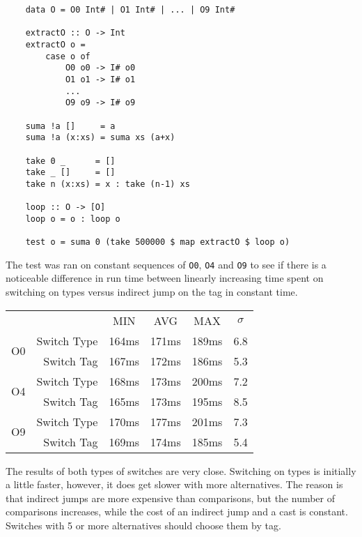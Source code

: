 \documentclass[en]{pracamgr}
\begin{document}
\begin{verbatim}
    data O = O0 Int# | O1 Int# | ... | O9 Int#
    
    extractO :: O -> Int
    extractO o =
        case o of
            O0 o0 -> I# o0
            O1 o1 -> I# o1
            ...
            O9 o9 -> I# o9

    suma !a []     = a
    suma !a (x:xs) = suma xs (a+x)

    take 0 _      = []
    take _ []     = []
    take n (x:xs) = x : take (n-1) xs

    loop :: O -> [O]
    loop o = o : loop o

    test o = suma 0 (take 500000 $ map extractO $ loop o)
\end{verbatim}


The test was ran on constant sequences of
\texttt{O0}, \texttt{O4} and \texttt{O9} to see
if there is a noticeable difference in run time
between linearly increasing time spent on switching on types
versus indirect jump on the tag in constant time.

\begin{center}
\begin{tabular}{c r c c c c}
    & & MIN & AVG & MAX & $\sigma$ \\
    \cline{3-6}
        
    \multirow{2}{*}{O0} & Switch Type & 164ms & 171ms & 189ms & 6.8 \\
    & Switch Tag & 167ms & 172ms & 186ms & 5.3 \\
    \cline{2-6}

    \multirow{2}{*}{O4} & Switch Type & 168ms & 173ms & 200ms & 7.2 \\
    & Switch Tag & 165ms & 173ms & 195ms & 8.5 \\
    \cline{2-6}

    \multirow{2}{*}{O9} & Switch Type & 170ms & 177ms & 201ms & 7.3 \\
    & Switch Tag & 169ms & 174ms & 185ms & 5.4 \\
\end{tabular}
\end{center}

The results of both types of switches are very close.
Switching on types is initially a little faster, however,
it does get slower with more alternatives.
The reason is that indirect jumps are more expensive than comparisons,
but the number of comparisons increases, while the cost of
an indirect jump and a cast is constant.
Switches with 5 or more alternatives should choose them by tag.
\end{document}
